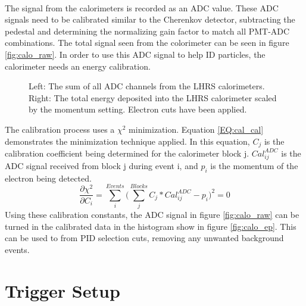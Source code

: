 	\paragraph{} The signal from the calorimeters is recorded as an ADC value. These ADC signals need to be calibrated similar to the Cherenkov detector, subtracting the pedestal and determining the normalizing gain factor to match all PMT-ADC combinations. The total signal seen from the colorimeter can be seen in figure \ref{fig:calo_raw}. In order to use this ADC signal to help ID particles, the calorimeter needs an energy calibration. 
	\begin{figure}[t]
		\centering
		\centering	
		\caption{Left: The sum of all ADC channels from the LHRS calorimeters. Right: The total energy deposited into the LHRS calorimeter scaled by the momentum setting. Electron cuts have been applied.}
	\end{figure}
	The calibration process uses a $\chi^2$ minimization. Equation \ref{EQ:cal_cal} demonstrates the minimization technique applied. In this equation, $C_j$ is the calibration coefficient being determined for the calorimeter block j. $Cal^{ADC}_{ij}$ is the ADC signal received from block j during event i, and $p_i$ is the momentum of the electron being detected. 
	\begin{equation}
		\frac{\partial\chi^2}{\partial C_i} = \sum\limits_{i}^{Events} \bigg( \sum\limits_{j}^{Blocks}C_{j}*Cal^{ADC}_{ij} - p_i  \bigg)^2 = 0 
		\label{EQ:cal_cal}
	\end{equation}
	Using these calibration constants, the ADC signal in figure \ref{fig:calo_raw} can be turned in the calibrated data in the histogram show in figure \ref{fig:calo_ep}. This can be used to from PID selection cuts, removing any unwanted background events.  
	
\section{Trigger Setup}\label{sec:Trig}
